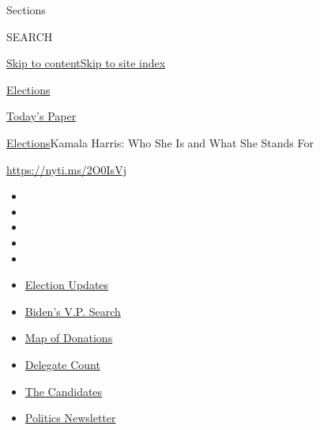 Sections

SEARCH

\protect\hyperlink{site-content}{Skip to
content}\protect\hyperlink{site-index}{Skip to site index}

\href{https://www.nytimes.com/news-event/2020-election}{Elections}

\href{https://myaccount.nytimes.com/auth/login?response_type=cookie\&client_id=vi}{}

\href{https://www.nytimes.com/section/todayspaper}{Today's Paper}

\href{/news-event/2020-election}{Elections}\textbar{}Kamala Harris: Who
She Is and What She Stands For

\url{https://nyti.ms/2O0IsVj}

\begin{itemize}
\item
\item
\item
\item
\item
\end{itemize}

\begin{itemize}
\item
  \href{https://www.nytimes.com/2020/07/31/us/elections/biden-vs-trump.html?action=click\&pgtype=Article\&state=default\&region=TOP_BANNER\&context=storylines_menu}{Election
  Updates}
\item
  \href{https://www.nytimes.com/article/biden-vice-president-2020.html?action=click\&pgtype=Article\&state=default\&region=TOP_BANNER\&context=storylines_menu}{Biden's
  V.P. Search}
\item
  \href{https://www.nytimes.com/interactive/2020/07/24/us/politics/trump-biden-campaign-donors.html?action=click\&pgtype=Article\&state=default\&region=TOP_BANNER\&context=storylines_menu}{Map
  of Donations}
\item
  \href{https://www.nytimes.com/interactive/2020/us/elections/delegate-count-primary-results.html?action=click\&pgtype=Article\&state=default\&region=TOP_BANNER\&context=storylines_menu}{Delegate
  Count}
\item
  \href{https://www.nytimes.com/interactive/2019/us/politics/2020-presidential-candidates.html?action=click\&pgtype=Article\&state=default\&region=TOP_BANNER\&context=storylines_menu}{The
  Candidates}
\item
  \href{https://www.nytimes.com/newsletters/politics?action=click\&pgtype=Article\&state=default\&region=TOP_BANNER\&context=storylines_menu}{Politics
  Newsletter}
\end{itemize}

